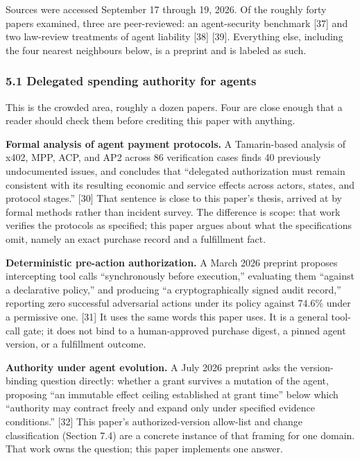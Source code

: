 \documentclass[
  11pt,
  letterpaper,
]{article}
\begin{document}
Sources were accessed September 17 through 19, 2026. Of the roughly
forty papers examined, three are peer-reviewed: an agent-security
benchmark {[}37{]} and two law-review treatments of agent liability
{[}38{]} {[}39{]}. Everything else, including the four nearest
neighbours below, is a preprint and is labeled as such.

\subsubsection{5.1 Delegated spending authority for
agents}\label{delegated-spending-authority-for-agents}

This is the crowded area, roughly a dozen papers. Four are close enough
that a reader should check them before crediting this paper with
anything.

\textbf{Formal analysis of agent payment protocols.} A Tamarin-based
analysis of x402, MPP, ACP, and AP2 across 86 verification cases finds
40 previously undocumented issues, and concludes that ``delegated
authorization must remain consistent with its resulting economic and
service effects across actors, states, and protocol stages.'' {[}30{]}
That sentence is close to this paper's thesis, arrived at by formal
methods rather than incident survey. The difference is scope: that work
verifies the protocols as specified; this paper argues about what the
specifications omit, namely an exact purchase record and a fulfillment
fact.

\textbf{Deterministic pre-action authorization.} A March 2026 preprint
proposes intercepting tool calls ``synchronously before execution,''
evaluating them ``against a declarative policy,'' and producing ``a
cryptographically signed audit record,'' reporting zero successful
adversarial actions under its policy against 74.6\% under a permissive
one. {[}31{]} It uses the same words this paper uses. It is a general
tool-call gate; it does not bind to a human-approved purchase digest, a
pinned agent version, or a fulfillment outcome.

\textbf{Authority under agent evolution.} A July 2026 preprint asks the
version-binding question directly: whether a grant survives a mutation
of the agent, proposing ``an immutable effect ceiling established at
grant time'' below which ``authority may contract freely and expand only
under specified evidence conditions.'' {[}32{]} This paper's
authorized-version allow-list and change classification (Section 7.4)
are a concrete instance of that framing for one domain. That work owns
the question; this paper implements one answer.
\end{document}

